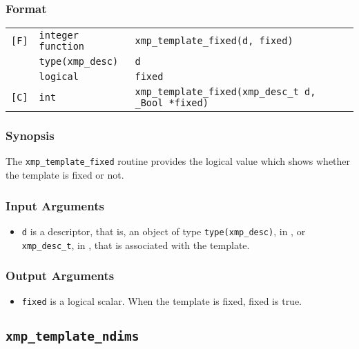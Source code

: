 \subsubsection*{Format}

\begin{tabular}{lll}

\verb![F]!& {\tt integer function}& {\tt xmp\_template\_fixed(d, fixed)}\\
          & {\tt type(xmp\_desc)} & {\tt d}\\
          & {\tt logical} & {\tt fixed}\\

\verb![C]!&  {\tt int}& {\tt xmp\_template\_fixed(xmp\_desc\_t d, \_Bool *fixed)}\\

\end{tabular}

\subsubsection*{Synopsis}

The {\tt xmp\_template\_fixed} routine provides the logical value which shows whether the template is fixed or not. 


\subsubsection*{Input Arguments}
\begin{itemize}
 \item {\tt d} is a descriptor, that is, an object of type 
       {\tt type(xmp\_desc)}, in {\XMPF}, or {\tt xmp\_desc\_t},
       in {\XMPC}, that is associated with the template.
\end{itemize}

\subsubsection*{Output Arguments}
\begin{itemize}
 \item {\tt fixed} is a logical scalar. When the template is fixed, fixed is true.
\end{itemize}

\subsection{\tt xmp\_template\_ndims}

